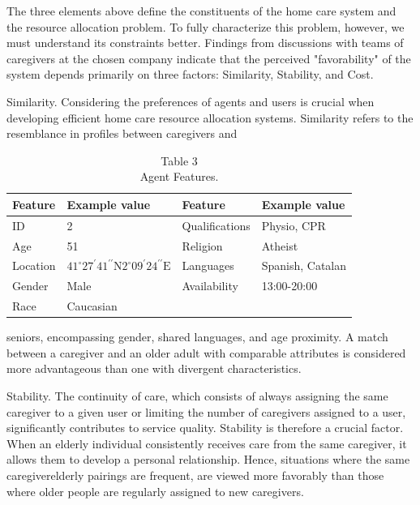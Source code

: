 \documentclass[10pt]{article}
\begin{document}
The three elements above define the constituents of the home care system and the resource allocation problem. To fully characterize this problem, however, we must understand its constraints better. Findings from discussions with teams of caregivers at the chosen company indicate that the perceived "favorability" of the system depends primarily on three factors: Similarity, Stability, and Cost.

Similarity. Considering the preferences of agents and users is crucial when developing efficient home care resource allocation systems. Similarity refers to the resemblance in profiles between caregivers and

\begin{table}[h]
\begin{center}
\captionsetup{labelformat=empty}
\caption{Table 3\\
Agent Features.}
\begin{tabular}{|l|l|l|l|}
\hline
Feature & Example value & Feature & Example value \\
\hline
ID & 2 & Qualifications & Physio, CPR \\
\hline
Age & 51 & Religion & Atheist \\
\hline
Location & $41^{\circ} 27^{\prime} 41^{\prime \prime} \mathrm{N} 2^{\circ} 09^{\prime} 24^{\prime \prime} \mathrm{E}$ & Languages & Spanish, Catalan \\
\hline
Gender & Male & Availability & 13:00-20:00 \\
\hline
Race & Caucasian &  &  \\
\hline
\end{tabular}
\end{center}
\end{table}

seniors, encompassing gender, shared languages, and age proximity. A match between a caregiver and an older adult with comparable attributes is considered more advantageous than one with divergent characteristics.

Stability. The continuity of care, which consists of always assigning the same caregiver to a given user or limiting the number of caregivers assigned to a user, significantly contributes to service quality. Stability is therefore a crucial factor. When an elderly individual consistently receives care from the same caregiver, it allows them to develop a personal relationship. Hence, situations where the same caregiverelderly pairings are frequent, are viewed more favorably than those where older people are regularly assigned to new caregivers.
\end{document}
